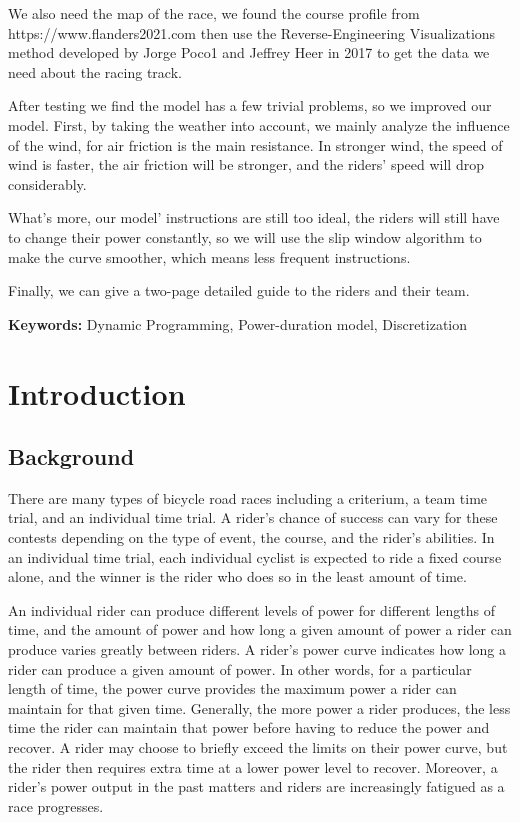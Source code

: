 \documentclass[12pt]{article}
\begin{document}
We also need the map of the race, we found the course profile from https://www.flanders2021.com
then use the Reverse-Engineering Visualizations method developed by Jorge Poco1 and Jeffrey Heer in 2017\cite{poco2017reverse} to get the data we need about the racing track.

After testing we find the model has a few trivial problems, so we improved our model.
First, by taking the weather into account, we mainly analyze the influence of the
wind, for air friction is the main resistance. In stronger wind, the speed of wind is faster, the air friction will be stronger,
and the riders' speed will drop considerably.

What's more, our model' instructions are still too ideal, the riders will still have to change their power constantly, so we will use the slip window algorithm to make the curve
smoother, which means less frequent instructions.

Finally, we can give a two-page detailed guide to the riders and their team.


\begin{flushleft}
    \textbf{Keywords:} Dynamic Programming, Power-duration model, Discretization
\end{flushleft}



\clearpage
\pagestyle{fancy}
\tableofcontents
\newpage
\setcounter{page}{1}


\section{Introduction}
\subsection{Background}

There are many types of bicycle road races including a criterium, a team time trial, and an
individual time trial. A rider's chance of success can vary for these contests depending on the
type of event, the course, and the rider's abilities. In an individual time trial, each individual
cyclist is expected to ride a fixed course alone, and the winner is the rider who does so in the
least amount of time.

An individual rider can produce different levels of power for different lengths of time, and the
amount of power and how long a given amount of power a rider can produce varies greatly
between riders. A rider's power curve indicates how long a rider can produce a given amount of
power. In other words, for a particular length of time, the power curve provides the maximum
power a rider can maintain for that given time. Generally, the more power a rider produces, the
less time the rider can maintain that power before having to reduce the power and
recover. A rider may choose to briefly exceed the limits on their power curve, but the rider then
requires extra time at a lower power level to recover. Moreover, a rider's power output in the
past matters and riders are increasingly fatigued as a race progresses.
\end{document}
